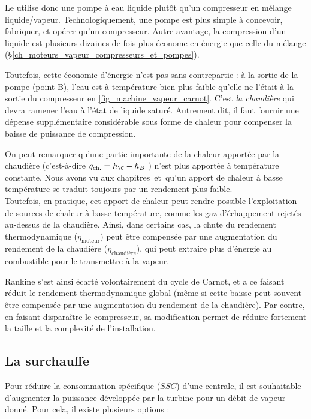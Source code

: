 		Le  utilise donc une pompe à eau liquide plutôt qu’un compresseur en mélange liquide/vapeur. Technologiquement, une pompe est plus simple à concevoir, fabriquer, et opérer qu’un compresseur. Autre avantage, la compression d’un liquide est plusieurs dizaines de fois plus économe en énergie que celle du mélange (\S\ref{ch_moteurs_vapeur_compresseurs_et_pompes}). 
		
		Toutefois, cette économie d’énergie n’est pas sans contrepartie : à la sortie de la pompe (point B), l’eau est à température bien plus faible qu’elle ne l’était à la sortie du compresseur en \cref{fig_machine_vapeur_carnot}. C’est \emph{la chaudière} qui devra ramener l’eau à l’état de liquide saturé. Autrement dit, il faut fournir une dépense supplémentaire considérable sous forme de chaleur pour compenser la baisse de puissance de compression.

		On peut remarquer qu’une partie importante de la chaleur apportée par la chaudière (c’est-à-dire $q_\text{ch.} = h_\C - h_B$ ) n’est plus apportée à température constante. Nous avons vu aux chapitres~\sept et~\huit qu’un apport de chaleur à basse température se traduit toujours par un rendement plus faible.\\
		Toutefois, en pratique, cet apport de chaleur peut rendre possible l’exploitation de sources de chaleur à basse température, comme les gaz d’échappement rejetés au-dessus de la chaudière. Ainsi, dans certains cas, la chute du rendement thermodynamique ($\eta_\text{moteur}$) peut être compensée par une augmentation du rendement de la chaudière ($\eta_\text{chaudière}$), qui peut extraire plus d’énergie au combustible pour le transmettre à la vapeur.
		
		Rankine s’est ainsi écarté volontairement du cycle de Carnot, et a ce faisant réduit le rendement thermodynamique global (même si cette baisse peut souvent être compensée par une augmentation du rendement de la chaudière). Par contre, en faisant disparaître le compresseur, sa modification permet de réduire fortement la taille et la complexité de l’installation.

		 

	\subsection{La surchauffe}

		Pour réduire la consommation spécifique ($SSC$) d’une centrale, il est souhaitable d’augmenter la puissance développée par la turbine pour un débit de vapeur donné. Pour cela, il existe plusieurs options :

